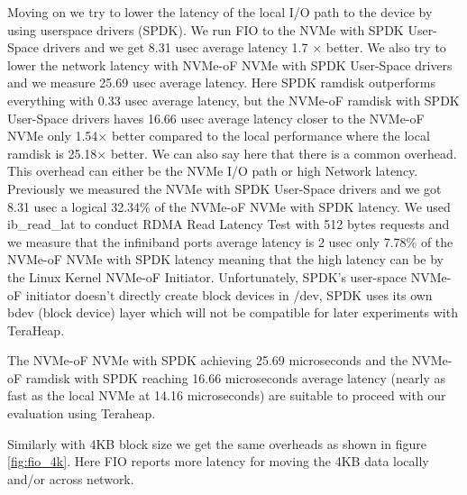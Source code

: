\par Moving on we try to lower the latency of the local I/O path to the device by using userspace drivers (SPDK). We run FIO to the NVMe with SPDK User-Space drivers and we get 8.31 usec average latency 1.7 × better. We also try to lower the network latency with NVMe-oF NVMe with SPDK User-Space drivers and we measure 25.69 usec average latency. Here SPDK ramdisk outperforms everything with 0.33 usec average latency, but the NVMe-oF ramdisk with SPDK User-Space drivers haves 16.66 usec average latency closer to the NVMe-oF NVMe only 1.54× better compared to the local performance where the local ramdisk is 25.18× better. We can also say here that there is a common overhead. This overhead can either be the NVMe I/O path or high Network latency. Previously we measured the NVMe with SPDK User-Space drivers and we got 8.31 usec a logical 32.34\% of the NVMe-oF NVMe with SPDK latency. We used ib\_read\_lat to conduct RDMA Read Latency Test with 512 bytes requests and we measure that the infiniband ports average latency is 2 usec only 7.78\% of the NVMe-oF NVMe with SPDK latency meaning that the high latency can be by the Linux Kernel NVMe-oF Initiator. Unfortunately, SPDK's user-space NVMe-oF initiator doesn't directly create block devices in /dev, SPDK uses its own bdev (block device) layer which will not be compatible for later experiments with TeraHeap. 
\par The NVMe-oF NVMe with SPDK achieving 25.69 microseconds and the NVMe-oF ramdisk with SPDK reaching 16.66 microseconds average latency (nearly as fast as the local NVMe at 14.16 microseconds) are suitable to proceed with our evaluation using Teraheap.
\par Similarly with 4KB block size we get the same overheads as shown in figure \ref{fig:fio_4k}. Here FIO reports more latency for moving the 4KB data locally and/or across network.

